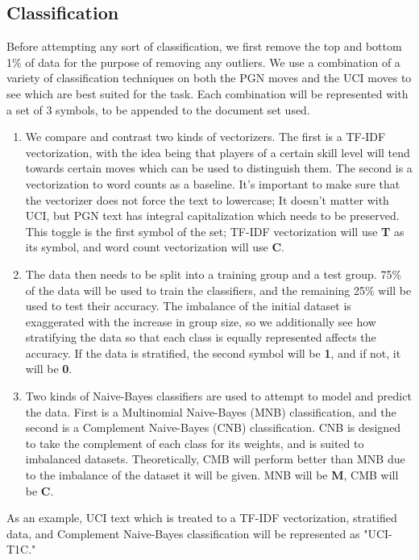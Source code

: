 \documentclass[conference]{IEEEtran}
\begin{document}
\subsection{Classification}
Before attempting any sort of classification, we first remove the top and bottom 1\% of data for the purpose of removing any outliers. We use a combination of a variety of classification techniques on both the PGN moves and the UCI moves to see which are best suited for the task. Each combination will be represented with a set of 3 symbols, to be appended to the document set used.
\begin{enumerate}
\item We compare and contrast two kinds of vectorizers. The first is a TF-IDF vectorization, with the idea being that players of a certain skill level will tend towards certain moves which can be used to distinguish them. The second is a vectorization to word counts as a baseline. It's important to make sure that the vectorizer does not force the text to lowercase; It doesn't matter with UCI, but PGN text has integral capitalization which needs to be preserved. This toggle is the first symbol of the set; TF-IDF vectorization will use \textbf{T} as its symbol, and word count vectorization will use \textbf{C}.
\item The data then needs to be split into a training group and a test group. 75\% of the data will be used to train the classifiers, and the remaining 25\% will be used to test their accuracy. The imbalance of the initial dataset is exaggerated with the increase in group size, so we additionally see how stratifying the data so that each class is equally represented affects the accuracy. If the data is stratified, the second symbol will be \textbf{1}, and if not, it will be \textbf{0}.
\item Two kinds of Naive-Bayes classifiers are used to attempt to model and predict the data. First is a Multinomial Naive-Bayes (MNB) classification, and the second is a Complement Naive-Bayes (CNB) classification. CNB is designed to take the complement of each class for its weights, and is suited to imbalanced datasets. Theoretically, CMB will perform better than MNB due to the imbalance of the dataset it will be given. MNB will be \textbf{M}, CMB will be \textbf{C}.
\end{enumerate}

As an example, UCI text which is treated to a TF-IDF vectorization, stratified data, and Complement Naive-Bayes classification will be represented as "UCI-T1C."
\end{document}
